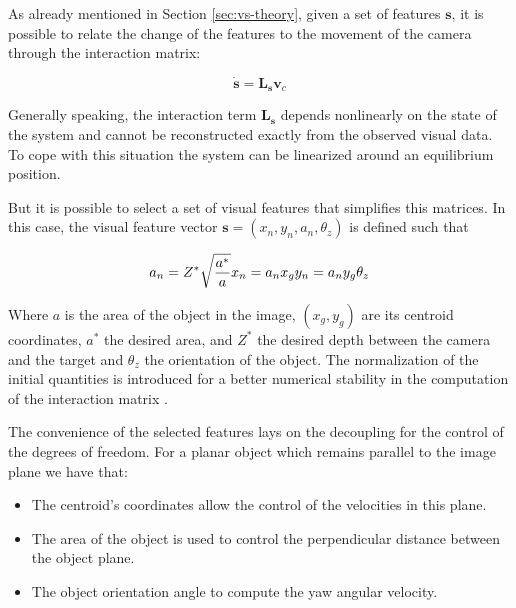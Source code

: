 As already mentioned in Section \ref{sec:vs-theory}, given a set of features $\bm{s}$, it is possible to relate the change of the features to the movement of the camera through the interaction matrix:

\begin{equation}
\dot{\bm{s}} = \bm{L_s} \bm{v}_c
\end{equation}

Generally speaking, the interaction term $\bm{L_s}$ depends nonlinearly on the state of the system and cannot be reconstructed exactly from the observed visual data. To cope with this situation the system can be linearized around an equilibrium position.

But it is possible to select a set of visual features that simplifies this matrices. In this case, the visual feature vector $\bm{s} = (x_n, y_n, a_n, \theta_z)$ is defined such that

\begin{equation*}
	a_n = Z^\ast \sqrt{\frac{a^\ast}{a}} \\
	x_n = a_n x_g \\
	y_n = a_n y_g \\
	\theta_z
\end{equation*}

Where $a$ is the area of the object in the image, $\left( x_g , y_g \right) $ are its centroid coordinates, $a^\ast$ the desired area, and $Z^\ast$ the desired depth between the camera and the target and $\theta_z$ the orientation of the object. The normalization of the initial quantities  is introduced for a better numerical stability in the computation of the interaction matrix \cite{tahri_2005}.

\pagebreak

 The convenience of the selected features lays on the decoupling for the control of the degrees of freedom. For a planar object which remains parallel to the image plane we have that:

\begin{itemize}
	\item The centroid's coordinates allow the control of the velocities in this plane.
	
	\item The area of the object is used to control the perpendicular distance between the object plane.
	
	\item The object orientation angle to compute the yaw angular velocity.
\end{itemize}

